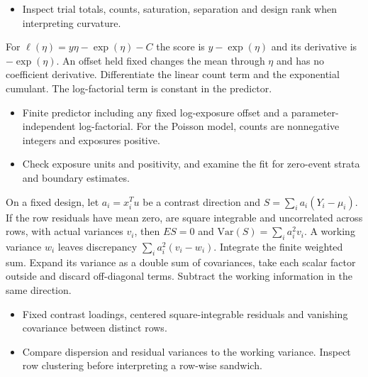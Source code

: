 \expandafter\def\csname statadic@diagnostics@STATADIC-GLM-002\endcsname{\begin{itemize}
\item Inspect trial totals, counts, saturation, separation and design rank when interpreting curvature.
\end{itemize}}
\expandafter\def\csname statadic@statement@STATADIC-GLM-003\endcsname{For $\ell(\eta)=y\eta-\exp(\eta)-C$ the score is
  $y-\exp(\eta)$ and its derivative is $-\exp(\eta)$.
  An offset held fixed changes the mean through $\eta$ and has no coefficient derivative.}
\expandafter\def\csname statadic@proof@STATADIC-GLM-003\endcsname{Differentiate the linear count term and the exponential
  cumulant. The log-factorial term is constant in the predictor.}
\expandafter\def\csname statadic@assumptions@STATADIC-GLM-003\endcsname{\begin{itemize}
\item Finite predictor including any fixed log-exposure offset and a parameter-independent log-factorial. For the Poisson model, counts are nonnegative integers and exposures positive.
\end{itemize}}
\expandafter\def\csname statadic@diagnostics@STATADIC-GLM-003\endcsname{\begin{itemize}
\item Check exposure units and positivity, and examine the fit for zero-event strata and boundary estimates.
\end{itemize}}
\expandafter\def\csname statadic@statement@STATADIC-GLMCOV-002\endcsname{On a fixed design, let $a_i=x_i^Tu$ be a contrast direction
  and $S=\sum_i a_i(Y_i-\mu_i)$. If the row residuals have mean zero, are
  square integrable and uncorrelated across rows, with actual variances $v_i$,
  then $E S=0$ and $\mathrm{Var}(S)=\sum_i a_i^2 v_i$.
  A working variance $w_i$ leaves discrepancy $\sum_i a_i^2(v_i-w_i)$.}
\expandafter\def\csname statadic@proof@STATADIC-GLMCOV-002\endcsname{Integrate the finite weighted sum. Expand its variance as a
  double sum of covariances, take each scalar factor outside and discard
  off-diagonal terms. Subtract the working information in the same direction.}
\expandafter\def\csname statadic@assumptions@STATADIC-GLMCOV-002\endcsname{\begin{itemize}
\item Fixed contrast loadings, centered square-integrable residuals and vanishing covariance between distinct rows.
\end{itemize}}
\expandafter\def\csname statadic@diagnostics@STATADIC-GLMCOV-002\endcsname{\begin{itemize}
\item Compare dispersion and residual variances to the working variance. Inspect row clustering before interpreting a row-wise sandwich.
\end{itemize}}
